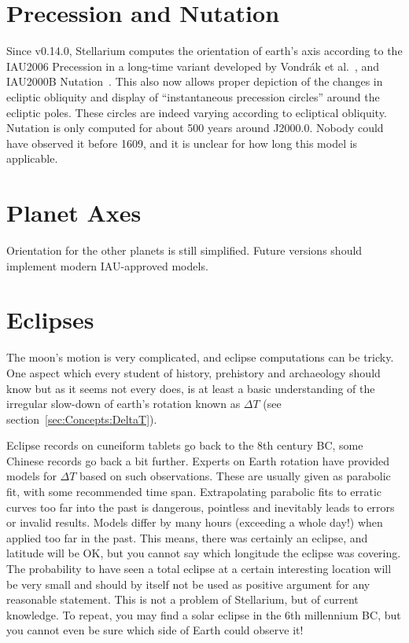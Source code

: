 \section{Precession and Nutation}
\label{sec:Accuracy:Precession}

Since v0.14.0, Stellarium computes the orientation of earth's axis
according to the IAU2006 Precession in a long-time variant developed
by Vondr\'ak et al.~\cite{2011AA:Vondrak}, and IAU2000B Nutation~\cite{Nutation:IAU2000B}.
This also now allows proper depiction of the changes in ecliptic obliquity
and display of ``instantaneous precession circles'' around the
ecliptic poles. These circles are indeed varying according to
ecliptical obliquity. Nutation is only computed for about 500 years
around J2000.0. Nobody could have observed it before 1609, and it is
unclear for how long this model is applicable.

\section{Planet Axes}
\label{sec:Accuracy:PlanetAxes}

Orientation for the other planets is still simplified. Future versions
should implement modern IAU-approved models. 

\section{Eclipses}
\label{sec:Accuracy:Eclipses}

The moon's motion is very complicated, and eclipse computations can be tricky. 
One aspect which every student of history, prehistory and archaeology should 
know but as it seems not every does, is at least a basic understanding of the 
irregular slow-down of earth's rotation known as $\Delta T$ (see section~\ref{sec:Concepts:DeltaT}). 

Eclipse records on cuneiform tablets go back to the 8th century BC, some Chinese 
records go back a bit further. Experts on Earth rotation have provided models 
for $\Delta T$ based on such observations. These are usually given as parabolic fit, 
with some recommended time span. Extrapolating parabolic fits to erratic curves too far into the past is dangerous, 
pointless and inevitably leads to errors or invalid results. Models differ by many hours (exceeding a whole day!)
when applied too far in the past. This means, there was certainly an eclipse, and latitude will be OK, 
but you cannot say which longitude the eclipse was covering. The probability to have seen a total 
eclipse at a certain interesting location will be very small and should by itself not be used as positive argument 
for any reasonable statement. This is not a problem of Stellarium, 
but of current knowledge. To repeat, you may find a solar eclipse in the 6th millennium BC, 
but you cannot even be sure which side of Earth could observe it!

